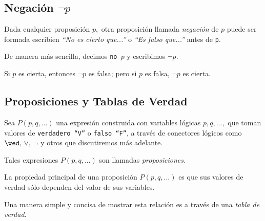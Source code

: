 \subsection{Negación $\neg p$}


 Dada cualquier proposición $p,$ otra proposición llamada \emph{negación} de $p$ puede ser formada escribien \emph{``No es cierto que...''} o \emph{``Es falso que...''} antes de \texttt{p}.
 
 De manera más sencilla, decimos \texttt{no $p$} y escribimos $\neg p.$
 
\begin{definicion}[Negación]
 Si $p$ es cierta, entonces $\neg p$ es falsa; pero si $p$ es falsa, $\neg p$ es cierta.
\end{definicion}
\subsection{Proposiciones y Tablas de Verdad}

 Sea $P(p,q,...)$ una expresión construida con variables lógicas $p,q,...,$ que toman valores de \texttt{verdadero ``V''} o \texttt{falso ``F''}, a trav\'es de conectores lógicos como $\wed, \, \vee, \, \neg$ y otros  que discutiremos más adelante.
 
 Tales expresiones $P(p,q,...)$ son llamadas \emph{proposiciones.}

 La propiedad principal de una proposición $P(p,q,...)$ es que sus valores de verdad sólo dependen del valor de sus variables. 
 
 Una manera simple y concisa de mostrar esta relación es a trav\'es de una \emph{tabla de verdad.}

